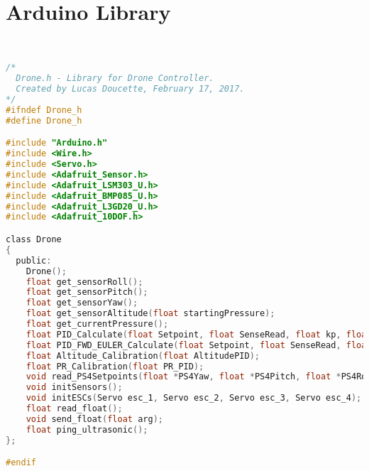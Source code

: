 \section{Arduino Library}
\lstset{basicstyle=\tiny}
\begin{lstlisting}[language=C,caption={Drone.h Arduino Header File},label={lst:Drone.h}]


/*
  Drone.h - Library for Drone Controller.
  Created by Lucas Doucette, February 17, 2017.
*/
#ifndef Drone_h
#define Drone_h

#include "Arduino.h"
#include <Wire.h>
#include <Servo.h>
#include <Adafruit_Sensor.h>
#include <Adafruit_LSM303_U.h>
#include <Adafruit_BMP085_U.h>
#include <Adafruit_L3GD20_U.h>
#include <Adafruit_10DOF.h>

class Drone
{
  public:
    Drone();
    float get_sensorRoll();
    float get_sensorPitch();
    float get_sensorYaw();
    float get_sensorAltitude(float startingPressure);
    float get_currentPressure();
    float PID_Calculate(float Setpoint, float SenseRead, float kp, float kd, float ki );
    float PID_FWD_EULER_Calculate(float Setpoint, float SenseRead, float kp, float kd, float ki, float Ts, float N);
    float Altitude_Calibration(float AltitudePID);
    float PR_Calibration(float PR_PID);
    void read_PS4Setpoints(float *PS4Yaw, float *PS4Pitch, float *PS4Roll, float *PS4Altitude);
    void initSensors();
    void initESCs(Servo esc_1, Servo esc_2, Servo esc_3, Servo esc_4);
    float read_float();
    void send_float(float arg);
    float ping_ultrasonic();
};

#endif

\end{lstlisting}



\newpage


